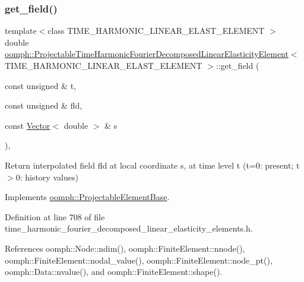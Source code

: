 \subsubsection{\texorpdfstring{get\+\_\+field()}{get\_field()}}
{\footnotesize\ttfamily template$<$class T\+I\+M\+E\+\_\+\+H\+A\+R\+M\+O\+N\+I\+C\+\_\+\+L\+I\+N\+E\+A\+R\+\_\+\+E\+L\+A\+S\+T\+\_\+\+E\+L\+E\+M\+E\+NT $>$ \\
double \hyperlink{classoomph_1_1ProjectableTimeHarmonicFourierDecomposedLinearElasticityElement}{oomph\+::\+Projectable\+Time\+Harmonic\+Fourier\+Decomposed\+Linear\+Elasticity\+Element}$<$ T\+I\+M\+E\+\_\+\+H\+A\+R\+M\+O\+N\+I\+C\+\_\+\+L\+I\+N\+E\+A\+R\+\_\+\+E\+L\+A\+S\+T\+\_\+\+E\+L\+E\+M\+E\+NT $>$\+::get\+\_\+field (\begin{DoxyParamCaption}\item[{const unsigned \&}]{t,  }\item[{const unsigned \&}]{fld,  }\item[{const \hyperlink{classoomph_1_1Vector}{Vector}$<$ double $>$ \&}]{s }\end{DoxyParamCaption})\hspace{0.3cm}{\ttfamily [inline]}, {\ttfamily [virtual]}}



Return interpolated field fld at local coordinate s, at time level t (t=0\+: present; t$>$0\+: history values) 



Implements \hyperlink{classoomph_1_1ProjectableElementBase_ae4da5b565b6d333be2f5920f7be763cd}{oomph\+::\+Projectable\+Element\+Base}.



Definition at line 708 of file time\+\_\+harmonic\+\_\+fourier\+\_\+decomposed\+\_\+linear\+\_\+elasticity\+\_\+elements.\+h.



References oomph\+::\+Node\+::ndim(), oomph\+::\+Finite\+Element\+::nnode(), oomph\+::\+Finite\+Element\+::nodal\+\_\+value(), oomph\+::\+Finite\+Element\+::node\+\_\+pt(), oomph\+::\+Data\+::nvalue(), and oomph\+::\+Finite\+Element\+::shape().

\mbox{\label{classoomph_1_1ProjectableTimeHarmonicFourierDecomposedLinearElasticityElement_a74c726d77137a9693a37d3b01eb321b8}} 
